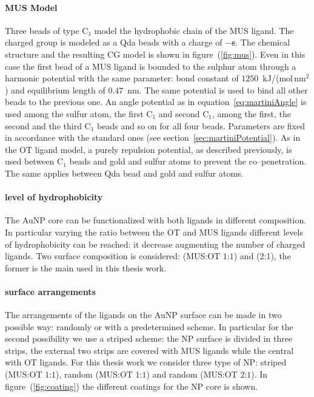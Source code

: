 \paragraph{\textbf{MUS Model}} Three \martini beads of type C$_1$ model the hydrophobic chain of the \ac{MUS} ligand. The charged group is modeled as a Qda beads with a charge of $-\mathsf{e}$. The chemical structure and the resulting \ac{CG} \martini model is shown in figure~(\ref{fig:mus}). Even in this case the first bead of a \ac{MUS} ligand is bounded to the sulphur atom through a harmonic potential with the same parameter: bond constant of $1250$~kJ/(mol\,nm$^2$) and equilibrium length of $0.47$~nm. The same potential is used to bind all other beads to the previous one. An angle potential as in equation~\eqref{eq:martiniAngle} is used among the sulfur atom, the first C$_1$ and second C$_1$, among the first, the second and the third C$_1$ beads and so on for all four beads. Parameters are fixed in accordance with the standard \martini ones (see section~\ref{sec:martiniPotential}). As in the \ac{OT} ligand model, a purely repulsion potential, as described previously, is used between C$_1$ beads and gold and sulfur atoms to prevent the co--penetration. The same applies between Qda bead and gold and sulfur atoms.

\paragraph{\textbf{level of hydrophobicity}} The \ac{AuNP} core can be functionalized with both ligands in different composition. In particular varying the ratio between the \ac{OT} and \ac{MUS} ligands different levels of hydrophobicity can be reached: it decrease augmenting the number of charged ligands. Two surface composition is considered: (\ac{MUS}:\ac{OT} $1$:$1$) and (2:1), the former is the main used in this thesis work.

\paragraph{\textbf{surface arrangements}} The arrangements of the ligands on the \ac{AuNP} surface can be made in two possible way: randomly or with a predetermined scheme. In particular for the second possibility we use a striped scheme: the \ac{NP} surface is divided in three strips, the external two strips are covered with \ac{MUS} ligands while the central with \ac{OT} ligands. For this thesis work we consider three type of \ac{NP}: striped (\ac{MUS}:\ac{OT} $1$:$1$), random (\ac{MUS}:\ac{OT} $1$:$1$) and random (\ac{MUS}:\ac{OT} $2$:$1$). In figure~(\ref{fig:coating}) the different coatings for the \ac{NP} core is shown.

